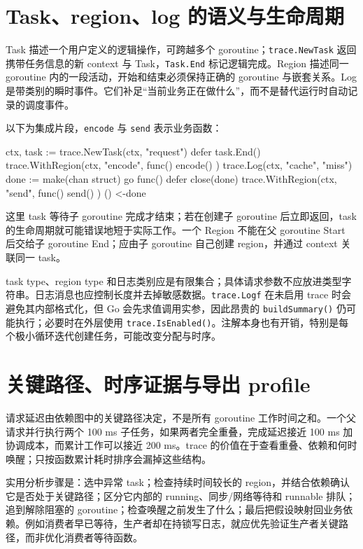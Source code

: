 \documentclass[UTF8,fontset=fandol,openany,11pt]{ctexbook}
\begin{document}
\section{Task、region、log 的语义与生命周期}
Task 描述一个用户定义的逻辑操作，可跨越多个 goroutine；\texttt{trace.\allowbreak{}NewTask} 返回携带任务信息的新 context 与 Task，\texttt{Task.\allowbreak{}End} 标记逻辑完成。Region 描述同一 goroutine 内的一段活动，开始和结束必须保持正确的 goroutine 与嵌套关系。Log 是带类别的瞬时事件。它们补足“当前业务正在做什么”，而不是替代运行时自动记录的调度事件。\cite{tools-trace-annotation}

以下为集成片段，\texttt{encode} 与 \texttt{send} 表示业务函数：

\begin{codeblock}
ctx, task := trace.NewTask(ctx, "request")
defer task.End()
trace.WithRegion(ctx, "encode", func() { encode() })
trace.Log(ctx, "cache", "miss")
done := make(chan struct{})
go func() {
    defer close(done)
    trace.WithRegion(ctx, "send", func() { send() })
}()
<-done
\end{codeblock}

这里 task 等待子 goroutine 完成才结束；若在创建子 goroutine 后立即返回，task 的生命周期就可能错误地短于实际工作。一个 Region 不能在父 goroutine Start 后交给子 goroutine End；应由子 goroutine 自己创建 region，并通过 context 关联同一 task。

task type、region type 和日志类别应是有限集合；具体请求参数不应放进类型字符串。日志消息也应控制长度并去掉敏感数据。\texttt{trace.\allowbreak{}Logf} 在未启用 trace 时会避免其内部格式化，但 Go 会先求值调用实参，因此昂贵的 \texttt{buildSummary()} 仍可能执行；必要时在外层使用 \texttt{trace.\allowbreak{}IsEnabled()}。注解本身也有开销，特别是每个极小循环迭代创建任务，可能改变分配与时序。

\section{关键路径、时序证据与导出 profile}
请求延迟由依赖图中的关键路径决定，不是所有 goroutine 工作时间之和。一个父请求并行执行两个 100 ms 子任务，如果两者完全重叠，完成延迟接近 100 ms 加协调成本，而累计工作可以接近 200 ms。trace 的价值在于查看重叠、依赖和何时唤醒；只按函数累计耗时排序会漏掉这些结构。

实用分析步骤是：选中异常 task；检查持续时间较长的 region，并结合依赖确认它是否处于关键路径；区分它内部的 running、同步/网络等待和 runnable 排队；追到解除阻塞的 goroutine；检查唤醒之前发生了什么；最后把假设映射回业务依赖。例如消费者早已等待，生产者却在持锁写日志，就应优先验证生产者关键路径，而非优化消费者等待函数。
\end{document}
